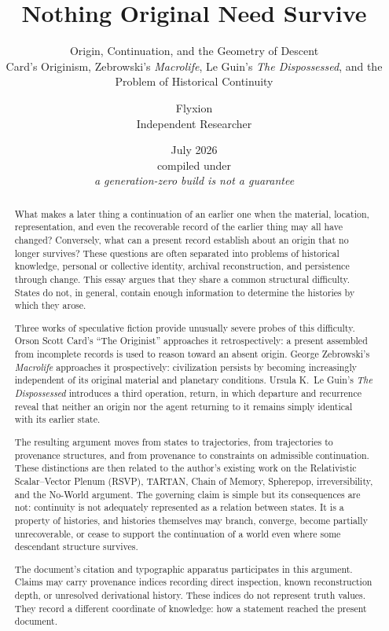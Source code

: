 \documentclass[
  11pt,
  a4paper,
  DIV=12,
  BCOR=0mm,
  parskip=half-
]{scrartcl}
\title{%
  \bfseries
  Nothing Original Need Survive
}
\subtitle{%
  Origin, Continuation, and the Geometry of Descent\\[4pt]
  \normalfont\small
  Card's Originism, Zebrowski's \emph{Macrolife},
  Le Guin's \emph{The Dispossessed}, and the Problem of
  Historical Continuity
}
\author{%
  Flyxion\\
  \normalfont\small
  Independent Researcher
}
\date{%
  July 2026\\[2pt]
  \footnotesize
  compiled under \enginename\\[2pt]
  \itshape
  a generation-zero build is not a guarantee
}
\theoremstyle{definition}
\theoremstyle{plain}
\theoremstyle{remark}
\begin{document}
\maketitle

\begin{abstract}
What makes a later thing a continuation of an earlier one when the material,
location, representation, and even the recoverable record of the earlier thing
may all have changed? Conversely, what can a present record establish about an
origin that no longer survives? These questions are often separated into
problems of historical knowledge, personal or collective identity, archival
reconstruction, and persistence through change. This essay argues that they
share a common structural difficulty. States do not, in general, contain enough
information to determine the histories by which they arose.

Three works of speculative fiction provide unusually severe probes of this
difficulty. Orson Scott Card's ``The Originist'' approaches it retrospectively:
a present assembled from incomplete records is used to reason toward an absent
origin. George Zebrowski's \emph{Macrolife} approaches it prospectively:
civilization persists by becoming increasingly independent of its original
material and planetary conditions. Ursula K.\ Le Guin's
\emph{The Dispossessed} introduces a third operation, return, in which departure
and recurrence reveal that neither an origin nor the agent returning to it
remains simply identical with its earlier state.

The resulting argument moves from states to trajectories, from trajectories
to provenance structures, and from provenance to constraints on admissible
continuation. These distinctions are then related to the author's existing
work on the Relativistic Scalar--Vector Plenum (RSVP), TARTAN, Chain of Memory,
Spherepop, irreversibility, and the No-World argument. The governing claim is
simple but its consequences are not: continuity is not adequately represented
as a relation between states. It is a property of histories, and histories
themselves may branch, converge, become partially unrecoverable, or cease to
support the continuation of a world even where some descendant structure
survives.

The document's citation and typographic apparatus participates in this
argument. Claims may carry provenance indices recording direct inspection,
known reconstruction depth, or unresolved derivational history. These indices
do not represent truth values. They record a different coordinate of knowledge:
how a statement reached the present document.
\end{abstract}
\end{document}
